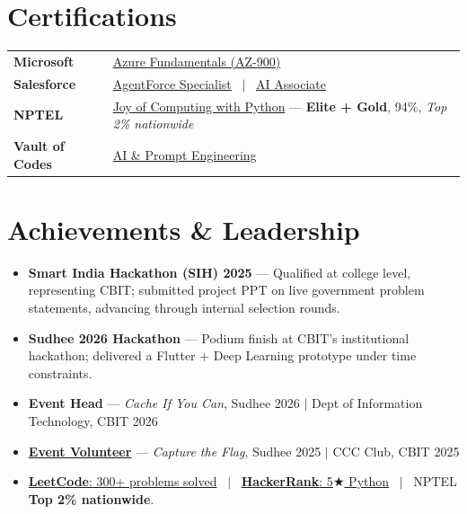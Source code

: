 \documentclass[a4paper,10.5pt]{article}
\begin{document}
\section{Certifications}
\vspace{1pt}
\begin{tabularx}{\linewidth}{@{}l X@{}}
\textbf{Microsoft}      & \href{https://drive.google.com/file/d/1Uj9T80eRGSfT8G-HdICgMUi--92Ffz_9/view?usp=share_link}{Azure Fundamentals (AZ-900)} \\[2pt]
\textbf{Salesforce}     & \href{https://drive.google.com/file/d/1ig8ZAgni9Ml1-eQw-yYwkyeQZiyzHk-t/view?usp=share_link}{AgentForce Specialist} \ $|$ \ \href{https://drive.google.com/file/d/12eKyzIrdg2E9JL7Ei6M3PfhkW0PfKh1l/view?usp=sharing}{AI Associate} \\[2pt]
\textbf{NPTEL}          & \href{https://drive.google.com/file/d/1xy7yMiITQlHQ5rMfqnr1E25GgKLNywxe/view?usp=share_link}{Joy of Computing with Python} --- \textbf{Elite + Gold}, 94\%, \textit{Top 2\% nationwide} \\[2pt]
\textbf{Vault of Codes} & \href{https://drive.google.com/file/d/1ZCG5hGw_KajViTB6CHOn3X3Br9BgI-SM/view?usp=share_link}{AI \& Prompt Engineering} \\
\end{tabularx}

\section{Achievements \& Leadership}
\vspace{1pt}
\begin{itemize}[nosep, leftmargin=1.5em, itemsep=1pt]
  \item[--] \textbf{Smart India Hackathon (SIH) 2025} --- Qualified at college level, representing CBIT; submitted project PPT on live government problem statements, advancing through internal selection rounds.
  \item[--] \textbf{Sudhee 2026 Hackathon} --- Podium finish at CBIT's institutional hackathon; delivered a Flutter + Deep Learning prototype under time constraints.
  \item[--] \textbf{Event Head} --- \textit{Cache If You Can}, Sudhee 2026 $|$ Dept of Information Technology, CBIT \hfill 2026
  \item[--] \href{https://drive.google.com/file/d/1yupQx853bTCgPQpJUgdcno5PdC6kmpVC/view?usp=share_link}{\textbf{Event Volunteer}} --- \textit{Capture the Flag}, Sudhee 2025 $|$ CCC Club, CBIT \hfill 2025
  \item[--] \href{https://leetcode.com/u/SESH_MANUVARTHI/}{\textbf{LeetCode}: 300+ problems solved} \ $|$ \ \href{https://www.hackerrank.com/profile/seshmanuvarthi27}{\textbf{HackerRank}: 5$\bigstar$ Python} \ $|$ \ NPTEL \textbf{Top 2\% nationwide}.
\end{itemize}
\end{document}
